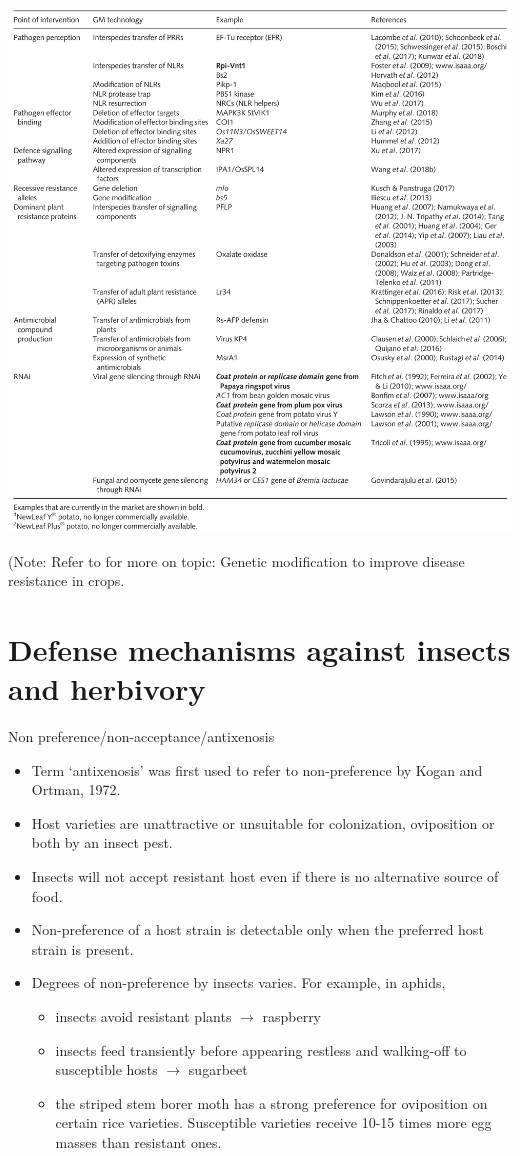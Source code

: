 \documentclass[11pt,dvipsnames,ignorenonframetext,aspectratio=169]{beamer}
\providecommand{\tightlist}{%
  \setlength{\itemsep}{0pt}\setlength{\parskip}{0pt}}
\begin{document}
\begin{frame}{}
\protect\hypertarget{section-4}{}
\begin{center}\includegraphics[width=0.4\linewidth]{../images/genetic_solution_pathogens} \end{center}

\tiny (Note: Refer to \citep{van2020genetic} for more on topic: Genetic
modification to improve disease resistance in crops.
\end{frame}

\hypertarget{defense-mechanisms-against-insects-and-herbivory}{%
\section{Defense mechanisms against insects and
herbivory}\label{defense-mechanisms-against-insects-and-herbivory}}

\begin{frame}{Non preference/non-acceptance/antixenosis}
\protect\hypertarget{non-preferencenon-acceptanceantixenosis}{}
\footnotesize

\begin{itemize}
\tightlist
\item
  Term `antixenosis' was first used to refer to non-preference by Kogan
  and Ortman, 1972.
\item
  Host varieties are unattractive or unsuitable for colonization,
  oviposition or both by an insect pest.
\item
  Insects will not accept resistant host even if there is no alternative
  source of food.
\item
  Non-preference of a host strain is detectable only when the preferred
  host strain is present.
\item
  Degrees of non-preference by insects varies. For example, in aphids,

  \begin{itemize}
  \item insects avoid resistant plants $\longrightarrow$ raspberry
  \item insects feed transiently before appearing restless and walking-off to susceptible hosts $\longrightarrow$ sugarbeet
  \item the striped stem borer moth has a strong preference for oviposition on certain rice varieties. Susceptible varieties receive 10-15 times more egg masses than resistant ones.
  \end{itemize}
\end{itemize}
\end{frame}
\end{document}
